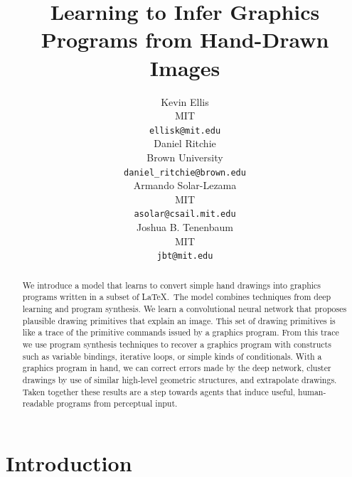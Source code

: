 \documentclass{article}
\title{Learning to Infer Graphics Programs from Hand-Drawn Images}
\author{
Kevin Ellis\\
  MIT\\
  \texttt{ellisk@mit.edu} \\
  \And
  Daniel Ritchie\\
Brown University\\
 \texttt{daniel\_ritchie@brown.edu} \\
 \And
 Armando Solar-Lezama\\
 MIT\\
\texttt{asolar@csail.mit.edu} \\
\And
Joshua B. Tenenbaum \\
MIT\\
\texttt{jbt@mit.edu}
}
\begin{document}

\maketitle

\begin{abstract}
  We introduce a model that learns to convert simple hand drawings
  into graphics programs written in a subset of \LaTeX.~The model
  combines techniques from deep learning and program synthesis.  We
  learn a convolutional neural network that proposes plausible drawing
  primitives that explain an image. This set of drawing primitives is
  like a trace of the primitive commands issued by a graphics
  program. From this trace we use program synthesis techniques to
  recover a graphics program with constructs such as variable
  bindings, iterative loops, or simple kinds of conditionals. With a
  graphics program in hand, we can correct errors made by the deep
  network, cluster drawings by use of similar high-level geometric
  structures, and extrapolate drawings.  Taken together these results
  are a step towards agents that induce useful, human-readable
  programs from perceptual input.
\end{abstract}

\section{Introduction}
\end{document}
